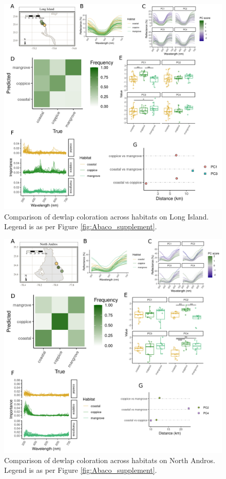 \pagebreak

\begin{figure}[H]
	\centering
	\includegraphics[width=\textwidth]{figures/LongIsland_supplement.png}
	\caption{Comparison of dewlap coloration across habitats on Long Island. Legend is as per Figure \ref{fig:Abaco_supplement}.}
	\label{fig:LongIsland}
\end{figure}

\pagebreak

\begin{figure}[H]
	\centering
	\includegraphics[width=\textwidth]{figures/NorthAndros_supplement.png}
	\caption{Comparison of dewlap coloration across habitats on North Andros. Legend is as per Figure \ref{fig:Abaco_supplement}.}
	\label{fig:NorthAndros}
\end{figure}

